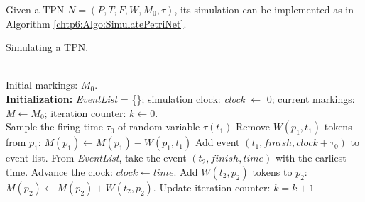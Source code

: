 \documentclass[suppldata]{interact}
\theoremstyle{plain}
\theoremstyle{definition}
\theoremstyle{remark}
\begin{document}
Given a TPN $N=(P, T, F,W, M_0, \tau)$, its simulation can be implemented as in Algorithm \ref{chtp6:Algo:SimulatePetriNet}. 
\begin{algorithm}
	\caption{Simulating a TPN.}
	\begin{algorithmic}[1]
		\label{chtp6:Algo:SimulatePetriNet}
		\REQUIRE ~~ \\
		Initial markings: $M_0$. \\
		
		\STATE \textbf{Initialization:}
		\STATE \textit{EventList} = \{\}; simulation clock: \textit{clock} $\leftarrow$ 0; current markings: $M\leftarrow M_0$;
		\STATE iteration counter: $k\leftarrow0$.\\
		
		\STATE Sample the firing time $\tau_0$ of random variable $\tau(t_1)$
		\STATE Remove $W(p_1,t_1)$ tokens from $p_1$: $M(p_1) \leftarrow M(p_1)-W(p_1,t_1)$
		\ENDFOR
		\STATE Add event $(t_1,finish,clock+\tau_0)$ to event list.
		\ENDWHILE
		\ENDFOR
		\STATE From \textit{EventList}, take the event $(t_2,finish,time)$ with the earliest time. 
		\STATE Advance the clock: $clock\leftarrow time$.
		\STATE Add $W(t_2,p_2)$ tokens to $p_2$: $M(p_2) \leftarrow M(p_2)+W(t_2,p_2)$.
		\ENDFOR		
		\STATE Update iteration counter: $k = k+1$
		\ENDWHILE		
	\end{algorithmic}
\end{algorithm}
\end{document}
